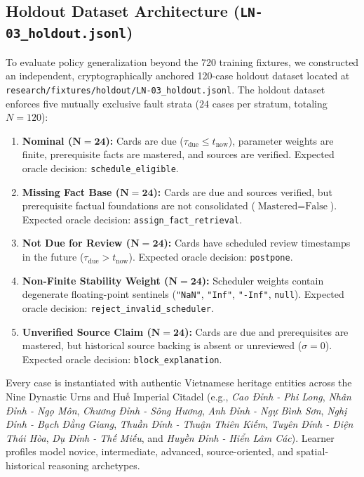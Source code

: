 \documentclass[11pt,a4paper]{article}
\begin{document}
\subsection{Holdout Dataset Architecture (\texttt{LN-03\_holdout.jsonl})}
To evaluate policy generalization beyond the 720 training fixtures, we constructed an independent, cryptographically anchored 120-case holdout dataset located at \texttt{research/fixtures/holdout/LN-03\_holdout.jsonl}. The holdout dataset enforces five mutually exclusive fault strata ($24$ cases per stratum, totaling $N=120$):
\begin{enumerate}[leftmargin=*]
    \item \textbf{Nominal ($\bm{N=24}$):} Cards are due ($\tau_{\text{due}} \le t_{\text{now}}$), parameter weights are finite, prerequisite facts are mastered, and sources are verified. Expected oracle decision: \texttt{schedule\_eligible}.
    \item \textbf{Missing Fact Base ($\bm{N=24}$):} Cards are due and sources verified, but prerequisite factual foundations are not consolidated ($\text{Mastered} = \text{False}$). Expected oracle decision: \texttt{assign\_fact\_retrieval}.
    \item \textbf{Not Due for Review ($\bm{N=24}$):} Cards have scheduled review timestamps in the future ($\tau_{\text{due}} > t_{\text{now}}$). Expected oracle decision: \texttt{postpone}.
    \item \textbf{Non-Finite Stability Weight ($\bm{N=24}$):} Scheduler weights contain degenerate floating-point sentinels (\texttt{"NaN"}, \texttt{"Inf"}, \texttt{"-Inf"}, \texttt{null}). Expected oracle decision: \texttt{reject\_invalid\_scheduler}.
    \item \textbf{Unverified Source Claim ($\bm{N=24}$):} Cards are due and prerequisites are mastered, but historical source backing is absent or unreviewed ($\sigma = 0$). Expected oracle decision: \texttt{block\_explanation}.
\end{enumerate}

Every case is instantiated with authentic Vietnamese heritage entities across the Nine Dynastic Urns and Huế Imperial Citadel (e.g., \textit{Cao Đỉnh - Phi Long}, \textit{Nhân Đỉnh - Ngọ Môn}, \textit{Chương Đỉnh - Sông Hương}, \textit{Anh Đỉnh - Ngự Bình Sơn}, \textit{Nghị Đỉnh - Bạch Đằng Giang}, \textit{Thuần Đỉnh - Thuận Thiên Kiếm}, \textit{Tuyên Đỉnh - Điện Thái Hòa}, \textit{Dụ Đỉnh - Thế Miếu}, and \textit{Huyền Đỉnh - Hiển Lâm Các}). Learner profiles model novice, intermediate, advanced, source-oriented, and spatial-historical reasoning archetypes.
\end{document}
